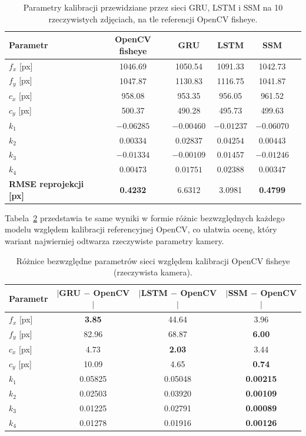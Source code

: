 \begin{table}[htbp]
  \centering
  \small
  \begin{tabular}{@{}lccccc@{}}
    \toprule
    \textbf{Parametr} & \textbf{OpenCV fisheye} & \textbf{GRU} & \textbf{LSTM} & \textbf{SSM} \\
    \midrule
    $f_x$ [px] & 1046.69 & 1050.54 & 1091.33 & 1042.73 \\
    $f_y$ [px] & 1047.87 & 1130.83 & 1116.75 & 1041.87 \\
    $c_x$ [px] & 958.08  & 953.35  & 956.05  & 961.52  \\
    $c_y$ [px] & 500.37  & 490.28  & 495.73  & 499.63  \\
    $k_1$      & $-0.06285$ & $-0.00460$ & $-0.01237$ & $-0.06070$ \\
    $k_2$      & $0.00334$  & $0.02837$  & $0.04254$  & $0.00443$  \\
    $k_3$      & $-0.01334$ & $-0.00109$ & $0.01457$  & $-0.01246$ \\
    $k_4$      & $0.00473$  & $0.01751$  & $0.02388$  & $0.00347$  \\
    \midrule
    \textbf{RMSE reprojekcji [px]} & \textbf{0.4232} & 6.6312 & 3.0981 & \textbf{0.4799} \\
    \bottomrule
  \end{tabular}
  \caption{Parametry kalibracji przewidziane przez sieci GRU, LSTM i SSM na 10 rzeczywistych zdjęciach, na tle referencji OpenCV fisheye.}
  \label{tab:wyniki-parametry}
\end{table}

Tabela~\ref{tab:wyniki-roznice} przedstawia te same wyniki w formie różnic
bezwzględnych każdego modelu względem kalibracji referencyjnej OpenCV, co
ułatwia ocenę, który wariant najwierniej odtwarza rzeczywiste parametry
kamery.

\begin{table}[htbp]
  \centering
  \small
  \begin{tabular}{@{}lccc@{}}
    \toprule
    \textbf{Parametr} & \textbf{$|$GRU $-$ OpenCV$|$} & \textbf{$|$LSTM $-$ OpenCV$|$} & \textbf{$|$SSM $-$ OpenCV$|$} \\
    \midrule
    $f_x$ [px] & \textbf{3.85}  & 44.64 & 3.96 \\
    $f_y$ [px] & 82.96 & 68.87 & \textbf{6.00} \\
    $c_x$ [px] & 4.73  & \textbf{2.03}  & 3.44 \\
    $c_y$ [px] & 10.09 & 4.65  & \textbf{0.74} \\
    $k_1$      & 0.05825 & 0.05048 & \textbf{0.00215} \\
    $k_2$      & 0.02503 & 0.03920 & \textbf{0.00109} \\
    $k_3$      & 0.01225 & 0.02791 & \textbf{0.00089} \\
    $k_4$      & 0.01278 & 0.01916 & \textbf{0.00126} \\
    \bottomrule
  \end{tabular}
  \caption{Różnice bezwzględne parametrów sieci względem kalibracji OpenCV fisheye (rzeczywista kamera).}
  \label{tab:wyniki-roznice}

  \vspace{2pt}
\end{table}

